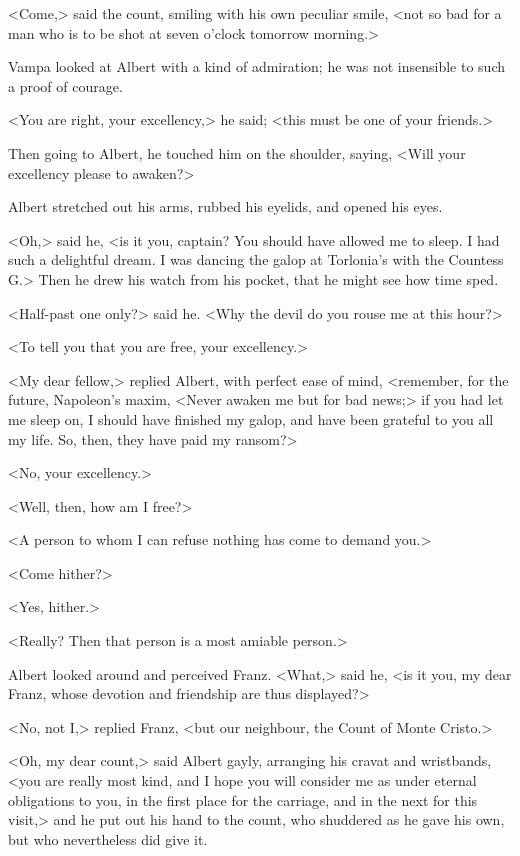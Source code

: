  <Come,> said the count, smiling with his own peculiar smile, <not so bad for a man who is to be shot at seven o'clock tomorrow morning.> 

 Vampa looked at Albert with a kind of admiration; he was not insensible to such a proof of courage. 

 <You are right, your excellency,> he said; <this must be one of your friends.> 

 Then going to Albert, he touched him on the shoulder, saying, <Will your excellency please to awaken?> 

 Albert stretched out his arms, rubbed his eyelids, and opened his eyes. 

 <Oh,> said he, <is it you, captain? You should have allowed me to sleep. I had such a delightful dream. I was dancing the galop at Torlonia's with the Countess G\doubleemdash.> Then he drew his watch from his pocket, that he might see how time sped. 

 <Half-past one only?> said he. <Why the devil do you rouse me at this hour?> 

 <To tell you that you are free, your excellency.> 

 <My dear fellow,> replied Albert, with perfect ease of mind, <remember, for the future, Napoleon's maxim, <Never awaken me but for bad news;> if you had let me sleep on, I should have finished my galop, and have been grateful to you all my life. So, then, they have paid my ransom?> 

 <No, your excellency.> 

 <Well, then, how am I free?> 

 <A person to whom I can refuse nothing has come to demand you.> 

 <Come hither?> 

 <Yes, hither.> 

 <Really? Then that person is a most amiable person.> 

 Albert looked around and perceived Franz. <What,> said he, <is it you, my dear Franz, whose devotion and friendship are thus displayed?> 

 <No, not I,> replied Franz, <but our neighbour, the Count of Monte Cristo.> 

 <Oh, my dear count,> said Albert gayly, arranging his cravat and wristbands, <you are really most kind, and I hope you will consider me as under eternal obligations to you, in the first place for the carriage, and in the next for this visit,> and he put out his hand to the count, who shuddered as he gave his own, but who nevertheless did give it. 

